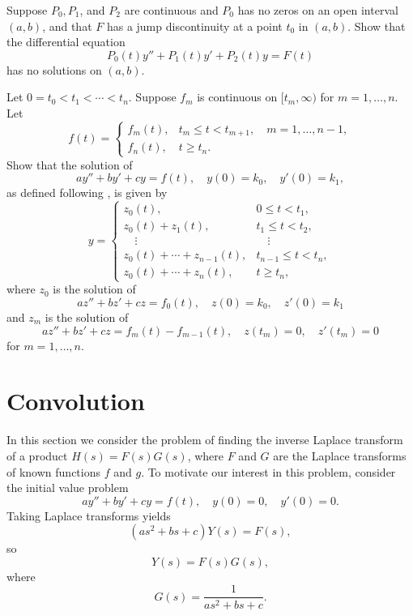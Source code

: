 \begin{exerciselist}
\item\label{exer:8.5.25}Suppose $P_0,P_1$, and $P_2$ are continuous and $P_0$
has no zeros on an open interval $(a,b)$, and  that $F$
has a jump discontinuity at a point $t_0$ in $(a,b)$.
Show that the differential equation
\[
P_0(t)y''+P_1(t)y'+P_2(t)y=F(t)
\]
has no solutions on $(a,b)$. 


\item\label{exer:8.5.26}Let $0=t_0<t_1<\cdots <t_n$. Suppose $f_m$ is continuous
on $[t_m,\infty)$ for $m=1,\dots,n$.
 Let
\[
f(t)=
\begin{cases}
f_m(t),&t_m\le t< t_{m+1},\quad m=1,\dots,n-1,\\
f_n(t),&t\ge t_n.
\end{cases}
\]
Show that the
solution of
\[
ay''+by'+cy=f(t), \quad  y(0)=k_0,\quad y'(0)=k_1,
\]
as defined following , is given by
\[
y=\begin{cases}
 z_0(t),&0\le t<t_1,\\
z_0(t)+ z_1(t),&t_1\le t<t_2,\\
\quad\vdots&\quad\vdots\\
z_0(t)+\cdots+z_{n-1}(t),&t_{n-1}\le t<t_n,\\
z_0(t)+\cdots+ z_n(t),&t\ge t_n,
\end{cases}
\]
where $z_0$ is the solution of
\[
az''+bz'+cz=f_0(t), \quad  z(0)=k_0,\quad  z'(0)=k_1
\]
and $z_m$ is the solution of
\[
az''+bz'+cz=f_m(t)-f_{m-1}(t), \quad  z(t_m)=0,\quad z'(t_m)=0
\]
for $m=1,\dots,n$.
\end{exerciselist}


\section{Convolution}\label{sec:laplace_convolution}

In this section we consider the problem of finding the inverse Laplace
transform of a product $H(s)=F(s)G(s)$, where $F$ and $G$ are the
Laplace transforms of known functions $f$ and $g$. To motivate our
interest in this problem, consider the initial value problem
\[
ay''+by'+cy=f(t),\quad y(0)=0,\quad y'(0)=0.
\]
Taking Laplace transforms  yields
\[
(as^2+bs+c)Y(s)=F(s),
\]
so
\begin{equation}\label{eq:8.6.1}
Y(s)=F(s)G(s),
\end{equation}
where
\[
G(s)=\frac{1}{as^2+bs+c}.
\]

